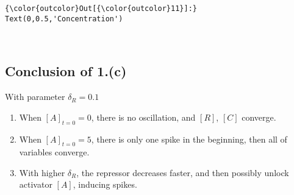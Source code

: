 \documentclass[11pt]{article}
\begin{document}
\begin{Verbatim}[commandchars=\\\{\}]
{\color{outcolor}Out[{\color{outcolor}11}]:} Text(0,0.5,'Concentration')
\end{Verbatim}
            
    \begin{center}
    \end{center}
    { \hspace*{\fill} \\}
    
    \subsection{Conclusion of 1.(c)}\label{conclusion-of-1.c}

With parameter \(\delta_R=0.1\)

\begin{enumerate}
\def\labelenumi{\arabic{enumi}.}
\item
  When \([A]_{t=0}=0\), there is no oscillation, and \([R]\), \([C]\)
  converge.
\item
  When \([A]_{t=0}=5\), there is only one spike in the beginning, then
  all of variables converge.
\item
  With higher \(\delta_{R}\), the repressor decreases faster, and then
  possibly unlock activator \([A]\), inducing spikes.
\end{enumerate}


    
    
    
    
\end{document}
